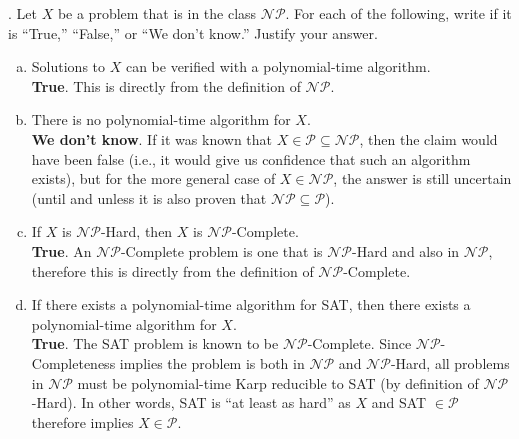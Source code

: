 \documentclass{scrartcl}
\begin{document}
    \bigskip
    . Let $X$ be a problem that is in the class $\mathcal{NP}$. For each of the following, write if
    it is ``True,'' ``False,'' or ``We don't know.'' Justify your answer.\\
    \begin{enumerate}[(a)]
        \item Solutions to $X$ can be verified with a polynomial-time algorithm.\\

            \textbf{True}. This is directly from the definition of $\mathcal{NP}$.\\
        \item There is no polynomial-time algorithm for $X$.\\

            \textbf{We don't know}. If it was known that $X \in \mathcal{P} \subseteq \mathcal{NP}$,
            then the claim would have been false (i.e., it would give us confidence that such an
            algorithm exists), but for the more general case of $X \in \mathcal{NP}$, the answer is
            still uncertain (until and unless it is also proven that $\mathcal{NP} \subseteq
            \mathcal{P}$).\\
        \item If $X$ is $\mathcal{NP}$-Hard, then $X$ is $\mathcal{NP}$-Complete.\\

            \textbf{True}. An $\mathcal{NP}$-Complete problem is one that is $\mathcal{NP}$-Hard and
            also in $\mathcal{NP}$, therefore this is directly from the definition of
            $\mathcal{NP}$-Complete.\\
        \item If there exists a polynomial-time algorithm for SAT, then there exists a
            polynomial-time algorithm for $X$.\\

            \textbf{True}. The SAT problem is known to be $\mathcal{NP}$-Complete. Since
            $\mathcal{NP}$-Completeness implies the problem is both in $\mathcal{NP}$ and
            $\mathcal{NP}$-Hard, all problems in $\mathcal{NP}$ must be polynomial-time Karp
            reducible to SAT (by definition of $\mathcal{NP}$-Hard). In other words, SAT is ``at
            least as hard'' as $X$ and SAT $\in \mathcal{P}$ therefore implies $X \in
            \mathcal{P}$.\\
    \end{enumerate}
\end{document}
